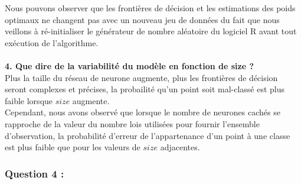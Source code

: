 \documentclass[a4paper, 10pt]{article}
\begin{document}
Nous pouvons observer que les frontières de décision et les estimations des poids optimaux ne changent pas avec un nouveau jeu de données du fait que nous veillons à ré-initialiser le générateur de nombre aléatoire du logiciel R avant tout exécution de l'algorithme.\\ \\
\textbf{4. Que dire de la variabilité du modèle en fonction de size ?}\\
Plus la taille du réseau de neurone augmente, plus les frontières de décision seront complexes et précises, la probailité qu'un point soit mal-classé est plus faible lorsque $size$ augmente.\\
Cependant, nous avons observé que lorsque le nombre de neurones cachés se rapproche de la valeur du nombre lois utilisées pour fournir l'ensemble d'observation, la probabilité d'erreur de l'appartenance d'un point à une classe est plus faible que pour les valeurs de $size$ adjacentes.

\subsubsection*{Question 4 :}
\end{document}
